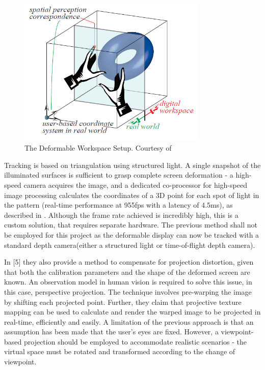 \documentclass[]{article}
\begin{document}
\begin{figure}[hbtp]
    \centering
    \includegraphics[width=0.8\textwidth]{figures/TheDeformableWorkspace.PNG}
    \caption{The Deformable Workspace Setup. Courtesy of \cite{watanabe08}}
    \label{fig:deformable_workspace}
\end{figure}

Tracking is based on triangulation using structured light. A single snapshot of the illuminated surfaces is sufficient to grasp complete screen deformation - a high-speed camera acquires the image, and a dedicated co-processor for high-speed image processing calculates the coordinates of a 3D point for each spot of light in the pattern (real-time performance at 955fps with a latency of 4.5ms), as described in \cite{watanabe07}. Although the frame rate achieved is incredibly high, this is a custom solution, that requires separate hardware. The previous method shall not be employed for this project as the deformable display can now be tracked with a standard depth camera(either a structured light or time-of-flight depth camera).

In [5] they also provide a method to compensate for projection distortion, given that both the calibration parameters and the shape of the deformed screen are known. An observation model in human vision is required to solve this issue, in this case, perspective projection. The technique involves pre-warping the image by shifting each projected point. Further, they claim that projective texture mapping can be used to calculate and render the warped image to be projected in real-time, efficiently and easily. A limitation of the previous approach is that an assumption has been made that the user’s eyes are fixed. However, a viewpoint-based projection should be employed to accommodate realistic scenarios - the virtual space must be rotated and transformed according to the change of viewpoint.\\
\end{document}
